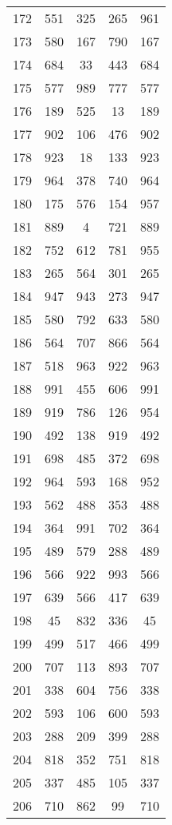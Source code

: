 \documentclass[a4paper,10pt,ngerman]{scrartcl}
\begin{document}
\begin{longtable}[c]{c|c|c|c|c}
    172 & 551 & 325 & 265 & 961 \\
    173 & 580 & 167 & 790 & 167 \\
    174 & 684 & 33 & 443 & 684 \\
    175 & 577 & 989 & 777 & 577 \\
    176 & 189 & 525 & 13 & 189 \\
    177 & 902 & 106 & 476 & 902 \\
    178 & 923 & 18 & 133 & 923 \\
    179 & 964 & 378 & 740 & 964 \\
    180 & 175 & 576 & 154 & 957 \\
    181 & 889 & 4 & 721 & 889 \\
    182 & 752 & 612 & 781 & 955 \\
    183 & 265 & 564 & 301 & 265 \\
    184 & 947 & 943 & 273 & 947 \\
    185 & 580 & 792 & 633 & 580 \\
    186 & 564 & 707 & 866 & 564 \\
    187 & 518 & 963 & 922 & 963 \\
    188 & 991 & 455 & 606 & 991 \\
    189 & 919 & 786 & 126 & 954 \\
    190 & 492 & 138 & 919 & 492 \\
    191 & 698 & 485 & 372 & 698 \\
    192 & 964 & 593 & 168 & 952 \\
    193 & 562 & 488 & 353 & 488 \\
    194 & 364 & 991 & 702 & 364 \\
    195 & 489 & 579 & 288 & 489 \\
    196 & 566 & 922 & 993 & 566 \\
    197 & 639 & 566 & 417 & 639 \\
    198 & 45 & 832 & 336 & 45 \\
    199 & 499 & 517 & 466 & 499 \\
    200 & 707 & 113 & 893 & 707 \\
    201 & 338 & 604 & 756 & 338 \\
    202 & 593 & 106 & 600 & 593 \\
    203 & 288 & 209 & 399 & 288 \\
    204 & 818 & 352 & 751 & 818 \\
    205 & 337 & 485 & 105 & 337 \\
    206 & 710 & 862 & 99 & 710 \\

\end{longtable}
\end{document}
